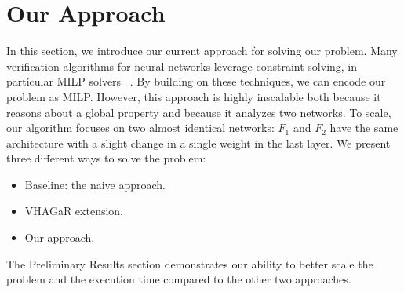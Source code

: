 
\section{Our Approach}
In this section, we introduce our current approach for solving our problem.
Many verification algorithms for neural networks leverage constraint solving, in particular MILP solvers ~\cite{VHAGAR,CFXROBUSTNESS,QEBVERIF,MIPVERIFY}.
By building on these techniques, we can encode our problem as MILP. 
However, this approach is highly inscalable both because it reasons about a global property and because it analyzes two networks.
To scale, our algorithm focuses on two almost identical networks: $F_1$ and $F_2$ have the same architecture with a slight change in a single weight in the last layer. We present three different ways to solve the problem:
\begin{itemize}
    \item Baseline: the naive approach.
    \item VHAGaR extension.
    \item Our approach.
\end{itemize}
The Preliminary Results section demonstrates our ability to better scale the problem and the execution time compared to the other two approaches.



